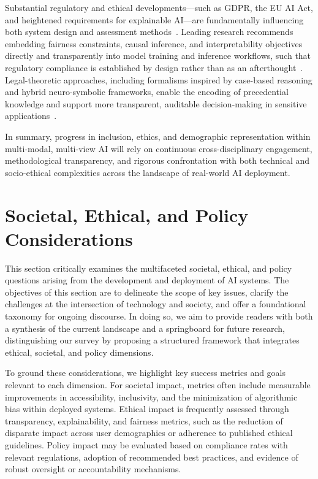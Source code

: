 \documentclass[sigconf]{acmart}
\begin{document}
Substantial regulatory and ethical developments—such as GDPR, the EU AI Act, and heightened requirements for explainable AI—are fundamentally influencing both system design and assessment methods~\cite{ref42,ref49,ref65}. Leading research recommends embedding fairness constraints, causal inference, and interpretability objectives directly and transparently into model training and inference workflows, such that regulatory compliance is established by design rather than as an afterthought~\cite{ref10,ref44,ref49,ref52,ref65}. Legal-theoretic approaches, including formalisms inspired by case-based reasoning and hybrid neuro-symbolic frameworks, enable the encoding of precedential knowledge and support more transparent, auditable decision-making in sensitive applications~\cite{ref46,ref49,ref50,ref53}.

In summary, progress in inclusion, ethics, and demographic representation within multi-modal, multi-view AI will rely on continuous cross-disciplinary engagement, methodological transparency, and rigorous confrontation with both technical and socio-ethical complexities across the landscape of real-world AI deployment.

\section{Societal, Ethical, and Policy Considerations}
This section critically examines the multifaceted societal, ethical, and policy questions arising from the development and deployment of AI systems. The objectives of this section are to delineate the scope of key issues, clarify the challenges at the intersection of technology and society, and offer a foundational taxonomy for ongoing discourse. In doing so, we aim to provide readers with both a synthesis of the current landscape and a springboard for future research, distinguishing our survey by proposing a structured framework that integrates ethical, societal, and policy dimensions.

To ground these considerations, we highlight key success metrics and goals relevant to each dimension. For societal impact, metrics often include measurable improvements in accessibility, inclusivity, and the minimization of algorithmic bias within deployed systems. Ethical impact is frequently assessed through transparency, explainability, and fairness metrics, such as the reduction of disparate impact across user demographics or adherence to published ethical guidelines. Policy impact may be evaluated based on compliance rates with relevant regulations, adoption of recommended best practices, and evidence of robust oversight or accountability mechanisms.
\end{document}
